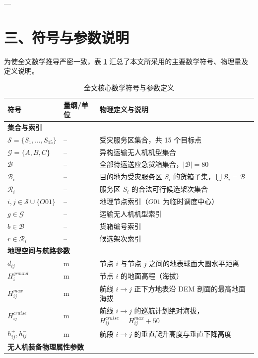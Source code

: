 \documentclass[12pt,a4paper,UTF8]{ctexart}
\begin{document}
---

\section{三、符号与参数说明}

为使全文数学推导严密一致，表 \ref{tab:notations} 汇总了本文所采用的主要数学符号、物理量及定义说明。

\begin{table}[H]
\centering
\small
\caption{全文核心数学符号与参数定义}
\label{tab:notations}
\begin{tabularx}{\textwidth}{p{3.2cm} p{2.2cm} X}
\toprule
\textbf{符号} & \textbf{量纲/单位} & \textbf{物理定义与说明} \\
\midrule
\multicolumn{3}{l}{\textbf{集合与索引}} \\
$\mathcal{S} = \{S_1, \dots, S_{15}\}$ & -- & 受灾服务区集合，共 15 个目标点 \\
$\mathcal{G} = \{A, B, C\}$ & -- & 异构运输无人机机型集合 \\
$\mathcal{B}$ & -- & 全部待运送应急货箱集合，$|\mathcal{B}| = 80$ \\
$\mathcal{B}_i$ & -- & 目的地为受灾服务区 $S_i$ 的货箱子集，$\bigcup \mathcal{B}_i = \mathcal{B}$ \\
$\mathcal{R}_i$ & -- & 服务区 $S_i$ 的合法可行候选架次集合 \\
$i, j \in \mathcal{S} \cup \{O01\}$ & -- & 地理节点索引（$O01$ 为临时调度中心） \\
$g \in \mathcal{G}$ & -- & 运输无人机机型索引 \\
$b \in \mathcal{B}$ & -- & 货箱编号索引 \\
$r \in \mathcal{R}_i$ & -- & 候选架次索引 \\
\midrule
\multicolumn{3}{l}{\textbf{地理空间与航路参数}} \\
$d_{ij}$ & $\text{m}$ & 节点 $i$ 与节点 $j$ 之间的地表球面大圆水平距离 \\
$H_i^{ground}$ & $\text{m}$ & 节点 $i$ 的地面高程（海拔） \\
$H_{ij}^{max}$ & $\text{m}$ & 航线 $i \to j$ 正下方地表沿 DEM 剖面的最高地面海拔 \\
$H_{ij}^{cruise}$ & $\text{m}$ & 航线 $i \to j$ 的巡航计划绝对海拔，$H_{ij}^{cruise} = H_{ij}^{max} + 50$ \\
$h_{ij}^+, h_{ij}^-$ & $\text{m}$ & 航段 $i \to j$ 的垂直爬升高度与垂直下降高度 \\
\midrule
\multicolumn{3}{l}{\textbf{无人机装备物理属性参数}} \\

\end{tabularx}
\end{table}
\end{document}
